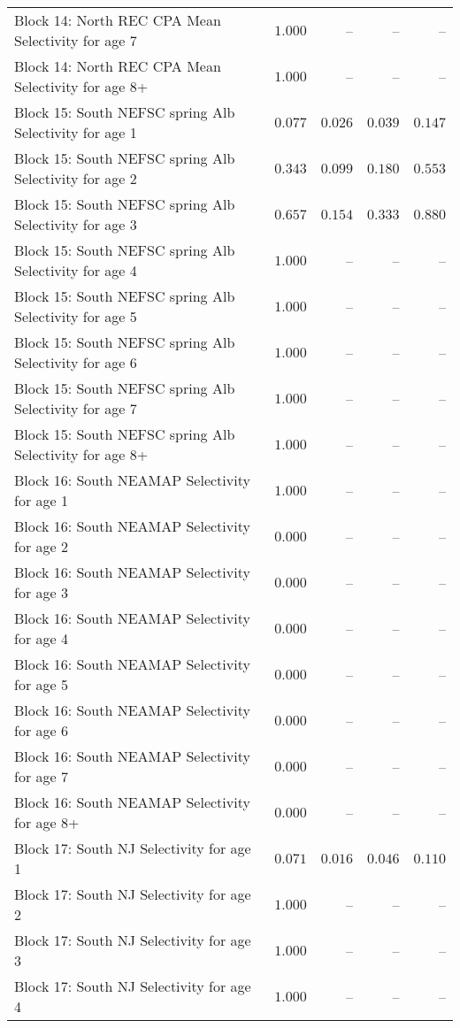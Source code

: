 \documentclass[
]{article}
\begin{document}
\begin{landscape}
\begin{longtable}[t]{lrrrr}
Block 14: North REC CPA Mean Selectivity for age 7 & $1.000$ & -- & -- & --\\
Block 14: North REC CPA Mean Selectivity for age 8+ & $1.000$ & -- & -- & --\\
Block 15: South NEFSC spring Alb Selectivity for age 1 & $0.077$ & $0.026$ & $0.039$ & $0.147$\\
Block 15: South NEFSC spring Alb Selectivity for age 2 & $0.343$ & $0.099$ & $0.180$ & $0.553$\\
\addlinespace
Block 15: South NEFSC spring Alb Selectivity for age 3 & $0.657$ & $0.154$ & $0.333$ & $0.880$\\
Block 15: South NEFSC spring Alb Selectivity for age 4 & $1.000$ & -- & -- & --\\
Block 15: South NEFSC spring Alb Selectivity for age 5 & $1.000$ & -- & -- & --\\
Block 15: South NEFSC spring Alb Selectivity for age 6 & $1.000$ & -- & -- & --\\
Block 15: South NEFSC spring Alb Selectivity for age 7 & $1.000$ & -- & -- & --\\
\addlinespace
Block 15: South NEFSC spring Alb Selectivity for age 8+ & $1.000$ & -- & -- & --\\
Block 16: South NEAMAP Selectivity for age 1 & $1.000$ & -- & -- & --\\
Block 16: South NEAMAP Selectivity for age 2 & $0.000$ & -- & -- & --\\
Block 16: South NEAMAP Selectivity for age 3 & $0.000$ & -- & -- & --\\
Block 16: South NEAMAP Selectivity for age 4 & $0.000$ & -- & -- & --\\
\addlinespace
Block 16: South NEAMAP Selectivity for age 5 & $0.000$ & -- & -- & --\\
Block 16: South NEAMAP Selectivity for age 6 & $0.000$ & -- & -- & --\\
Block 16: South NEAMAP Selectivity for age 7 & $0.000$ & -- & -- & --\\
Block 16: South NEAMAP Selectivity for age 8+ & $0.000$ & -- & -- & --\\
Block 17: South NJ Selectivity for age 1 & $0.071$ & $0.016$ & $0.046$ & $0.110$\\
\addlinespace
Block 17: South NJ Selectivity for age 2 & $1.000$ & -- & -- & --\\
Block 17: South NJ Selectivity for age 3 & $1.000$ & -- & -- & --\\
Block 17: South NJ Selectivity for age 4 & $1.000$ & -- & -- & --\\

\end{longtable}
\end{landscape}
\end{document}
